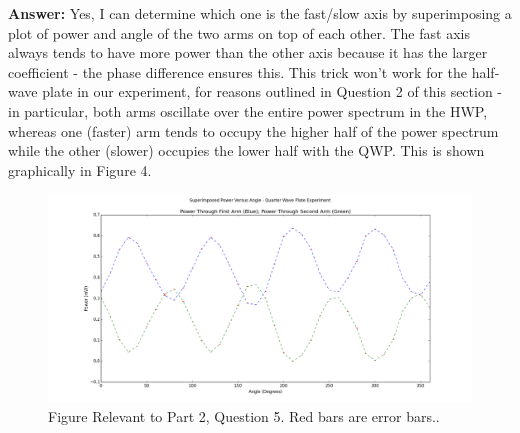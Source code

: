 \documentclass[10pt,a4paper]{article}
\begin{document}
\begin{enumerate}
\textbf{Answer: } Yes, I can determine which one is the fast/slow axis by superimposing a plot of power and angle of the two arms on top of each other. The fast axis always tends to have more power than the other axis because it has the larger coefficient - the phase difference ensures this. This trick won't work for the half-wave plate in our experiment, for reasons outlined in Question 2 of this section - in particular, both arms oscillate over the entire power spectrum in the HWP, whereas one (faster) arm tends to occupy the higher half of the power spectrum while the other (slower) occupies the lower half with the QWP. This is shown graphically in Figure 4.
\begin{figure}[h]
\centering
\includegraphics[width = \textwidth]{../Analysis/figure_5.png}
\caption{Figure Relevant to Part 2, Question 5. Red bars are error bars..} 
\end{figure}
\end{enumerate}
\end{document}
